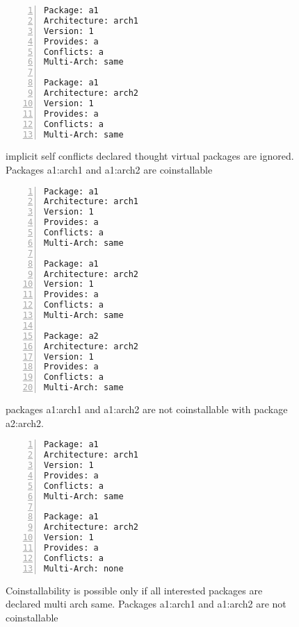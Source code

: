 \begin{figure}
\begin{lstlisting}[style=debctrl,numbers=left,xleftmargin=20pt,basicstyle=\footnotesize\normalfont\ttfamily]
Package: a1
Architecture: arch1
Version: 1
Provides: a
Conflicts: a
Multi-Arch: same

Package: a1
Architecture: arch2
Version: 1
Provides: a
Conflicts: a
Multi-Arch: same
\end{lstlisting}
\caption{implicit self conflicts declared thought virtual packages are
ignored. Packages a1:arch1 and a1:arch2 are coinstallable}
\label{fig:arch-same-2}
\end{figure}

\begin{figure}
\begin{lstlisting}[style=debctrl,numbers=left,xleftmargin=20pt,basicstyle=\footnotesize\normalfont\ttfamily]
Package: a1
Architecture: arch1
Version: 1
Provides: a
Conflicts: a
Multi-Arch: same

Package: a1
Architecture: arch2
Version: 1
Provides: a
Conflicts: a
Multi-Arch: same

Package: a2
Architecture: arch2
Version: 1
Provides: a
Conflicts: a
Multi-Arch: same
\end{lstlisting}
\caption{packages a1:arch1 and a1:arch2 are not coinstallable with
package a2:arch2.}
\label{fig:arch-same-3}
\end{figure}

\begin{figure}
\begin{lstlisting}[style=debctrl,numbers=left,xleftmargin=20pt,basicstyle=\footnotesize\normalfont\ttfamily]
Package: a1
Architecture: arch1
Version: 1
Provides: a
Conflicts: a
Multi-Arch: same

Package: a1
Architecture: arch2
Version: 1
Provides: a
Conflicts: a
Multi-Arch: none
\end{lstlisting}
\caption{Coinstallability is possible only if all interested packages
are declared multi arch same.  Packages a1:arch1 and a1:arch2 are not
coinstallable}
\label{fig:arch-same-4}
\end{figure}


